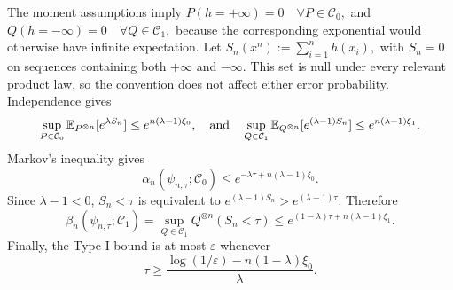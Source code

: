 \documentclass[journal,10pt,draftclsnofoot,onecolumn]{IEEEtran}
\begin{document}
\begin{IEEEproof}
The moment assumptions imply $ P(h=+\infty)=0 \quad \forall P\in\mathcal C_0,$ and $ Q(h=-\infty)=0 \quad \forall Q\in\mathcal C_1,$ because the corresponding exponential would otherwise have infinite expectation. Let $S_n(x^n) := \sum_{i=1}^n h(x_i),$ with $S_n=0$ on sequences containing both $+\infty$ and $-\infty$. This set is null under every relevant product law, so the convention
does not affect either error probability. Independence gives
\begin{equation*}
\sup_{P\in\mathcal C_0} \mathbb E_{P^{\otimes n}} [e^{\lambda S_n}] \leq e^{n(\lambda-1)\xi_0}, \quad {\rm and} \quad \sup_{Q\in\mathcal C_1} \mathbb E_{Q^{\otimes n}} [e^{(\lambda-1)S_n}] \leq e^{n(\lambda-1)\xi_1}.
\end{equation*}
Markov's inequality gives
\begin{equation*}
\alpha_n(\psi_{n,\tau};\mathcal C_0) \leq e^{-\lambda\tau+n(\lambda-1)\xi_0}.
\end{equation*}
Since $\lambda-1<0$, $S_n<\tau$
is equivalent to $e^{(\lambda-1)S_n}>e^{(\lambda-1)\tau}.$ Therefore
\begin{equation*}
\beta_n(\psi_{n,\tau};\mathcal C_1)=
\sup_{Q\in\mathcal C_1}Q^{\otimes n}(S_n<\tau) \leq
e^{(1-\lambda)\tau+n(\lambda-1)\xi_1}.
\end{equation*}
Finally, the Type I bound is at most $\varepsilon$ whenever
\begin{equation*}
\tau \geq \frac{ \log(1/\varepsilon)-n(1-\lambda)\xi_0 }{\lambda}.
\end{equation*}
\end{IEEEproof}

\end{document}
